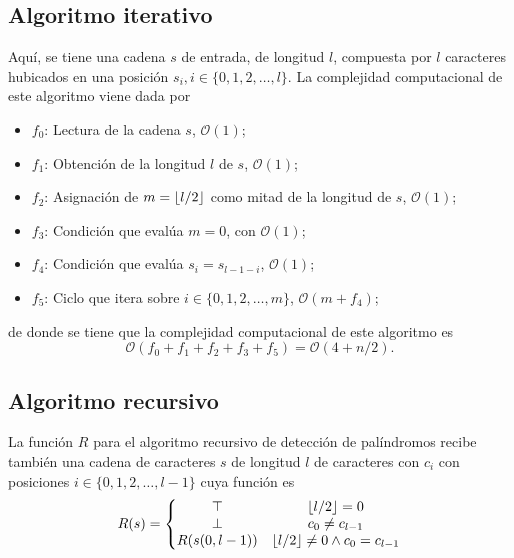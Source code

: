 \documentclass[paper=leter, fontsize=11pt]{scrartcl}
\numberwithin{equation}{section}		%
\numberwithin{figure}{section}			%
\numberwithin{table}{section}				%
\DeclarePairedDelimiter\floor{\lfloor}{\rfloor}
\begin{document}
\subsection{Algoritmo iterativo}
Aquí, se tiene una cadena $s$ de entrada, de longitud $l$, compuesta por $l$ caracteres hubicados en una posición $s_i, i \in \{0, 1, 2, \ldots, l\}$. La complejidad computacional de este algoritmo viene dada por
\begin{itemize}
    \item $f_0$: Lectura de la cadena $s$, $\mathcal{O}(1)$;
    \item $f_1$: Obtención de la longitud $l$ de $s$, $\mathcal{O}(1)$;
    \item $f_2$: Asignación de $m = \floor*{l / 2}$ como mitad de la longitud de $s$, $\mathcal{O}(1)$;
    \item $f_3$: Condición que evalúa $m = 0$,  con $\mathcal{O}(1)$;
    \item $f_4$: Condición que evalúa $s_i = s_{l - 1 - i}$, $\mathcal{O}(1)$;
    \item $f_5$: Ciclo que itera sobre $i \in \{0, 1, 2, \ldots, m\}$, $\mathcal{O}(m + f_4)$;
\end{itemize}
de donde se tiene que la complejidad computacional de este algoritmo es
\begin{equation}
    \mathcal{O}(f_0 + f_1 + f_2 + f_3 + f_5) = \mathcal{O}(4 + n / 2).
\end{equation}

\subsection{Algoritmo recursivo}

La función $R$ para el algoritmo recursivo de detección de palíndromos recibe también una cadena de caracteres $s$ de longitud $l$ de caracteres con $c_i$ con posiciones $i \in \{0, 1, 2, \ldots, l - 1\}$ cuya función es
\begin{equation}
    R(s) = \left\{\begin{matrix}
       \top & \floor*{l /2} = 0\\ 
       \bot & c_0 \neq c_{l - 1}\\
       R(s(0, l-1)) & \floor*{l /2} \neq 0 \land c_0 = c_{l - 1}
       \end{matrix}\right.
\end{equation}
\end{document}
